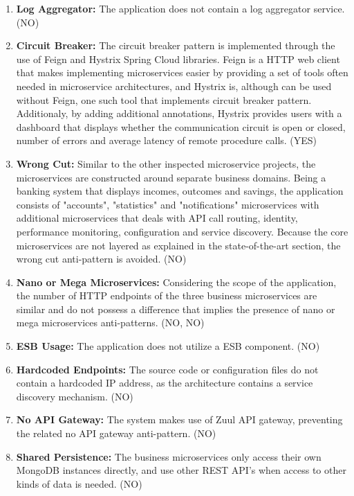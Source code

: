 \documentclass{Configuration_Files/PoliMi3i_thesis}
\begin{document}
\begin{enumerate}
    \item \textbf{Log Aggregator:} The application does not contain a log aggregator service. (NO)
    
    \item \textbf{Circuit Breaker:} The circuit breaker pattern is implemented through the use of Feign and Hystrix Spring Cloud libraries.
    Feign is a HTTP web client that makes implementing microservices easier by providing a set of tools often needed in microservice architectures, and Hystrix is, although can be used without Feign, one such tool that implements circuit breaker pattern.
    Additionaly, by adding additional annotations, Hystrix provides users with a dashboard that displays whether the communication circuit is open or closed, number of errors and average latency of remote procedure calls. (YES)
    
    \item \textbf{Wrong Cut:} Similar to the other inspected microservice projects, the microservices are constructed around separate business domains.
    Being a banking system that displays incomes, outcomes and savings, the application consists of "accounts", "statistics" and "notifications" microservices with additional microservices that deals with API call routing, identity, performance monitoring, configuration and service discovery.
    Because the core microservices are not layered as explained in the state-of-the-art section, the wrong cut anti-pattern is avoided. (NO)
    
    \item \textbf{Nano or Mega Microservices:} Considering the scope of the application, the number of HTTP endpoints of the three business microservices are similar and do not possess a difference that implies the presence of nano or mega microservices anti-patterns. (NO, NO)
    
    \item \textbf{ESB Usage:} The application does not utilize a ESB component. (NO)
    
    \item \textbf{Hardcoded Endpoints:} The source code or configuration files do not contain a hardcoded IP address, as the architecture contains a service discovery mechanism. (NO)
    
    \item \textbf{No API Gateway:} The system makes use of Zuul API gateway, preventing the related no API gateway anti-pattern. (NO)
    
    \item \textbf{Shared Persistence:} The business microservices only access their own MongoDB instances directly, and use other REST API's when access to other kinds of data is needed. (NO)
    

\end{enumerate}
\end{document}
